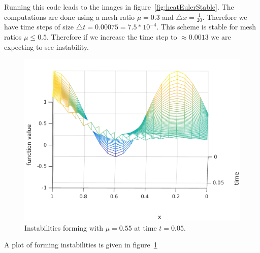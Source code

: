 \documentclass[ twoside,openright,titlepage,numbers=noenddot,headinclude,%
                footinclude=true,cleardoublepage=empty,abstractoff, %
                BCOR=5mm,paper=a4,fontsize=11pt,%
                ngerman,american,%
                ]{scrreprt}
\begin{document}
Running this code leads to the images in figure~\ref{fig:heatEulerStable}. The computations are done using a mesh ratio $\mu = 0.3$ and $\triangle x = \frac{1}{20}$. Therefore we have time steps of size $\triangle t = 0.00075 = 7.5 * 10^{-4}$. This scheme is stable for mesh ratios $\mu \leq 0.5$. Therefore if we increase the time step to $\approx 0.0013$ we are expecting to see instability. 
\begin{figure}
\includegraphics[scale = 0.6]{images/muUnstable.png}
\caption{Instabilities forming with $\mu = 0.55$ at time $t = 0.05$.}
\label{fig:heatEulerUnstable}
\end{figure}
A plot of forming instabilities is given in figure~\ref{fig:heatEulerUnstable}
\end{document}
